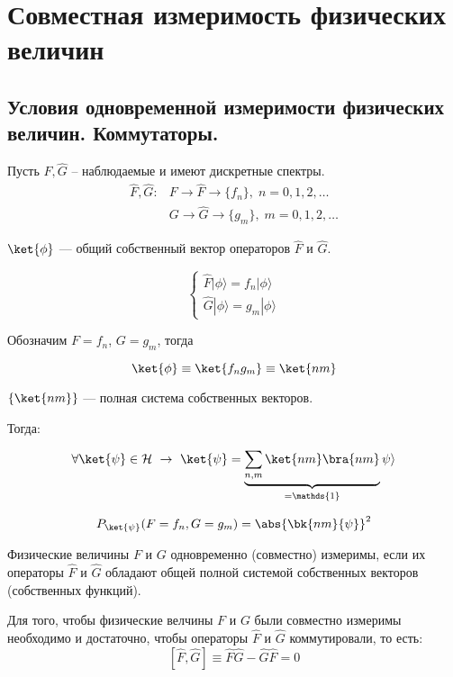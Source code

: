 \chapter{Совместная измеримость физических величин}

\section{Условия одновременной измеримости физических величин. Коммутаторы.}

Пусть $\widehat{F}, \widehat{G}$ -- наблюдаемые и имеют дискретные спектры.
$$
\begin{array}{lcl}
\widehat{F}, \widehat{G}:  & F \rightarrow \widehat{F} \rightarrow \{f_n\}, \; n=0,1,2,\dots\\
                           & G \rightarrow \widehat{G} \rightarrow \{g_m\}, \; m=0,1,2,\dots
\end{array}
$$

$\ket{\phi}$ --- общий собственный вектор операторов $\widehat{F}$ и $\widehat{G}$.

\begin{equation}
\label{eq:4_1_1}
\begin{cases}
\widehat{F} |\phi \rangle = f_n |\phi \rangle\\
\widehat{G} |\phi \rangle = g_m |\phi \rangle
\end{cases} 
\end{equation}

Обозначим $F = f_n$, $G=g_m$, тогда

$$\ket{\phi} \equiv \ket{f_n g_m} \equiv \ket{nm}$$

$\{\ket{nm}\}$ --- полная система собственных векторов.

Тогда:

\begin{equation}
\label{eq:4_1_2}
\forall \ket{\psi} \in \mathcal{H} ~\rightarrow ~ \ket{\psi} = \underbrace{\sum_{n,m}\ket{nm}\bra{nm}}_{=\mathds{1}} \psi \rangle 
\end{equation}

$$P_{\ket{\psi}}(F = f_n, G = g_m) = \abs{\bk{nm}{\psi}}^2$$

\begin{defn}
Физические величины $F$ и $G$ одновременно (совместно) измеримы, если их операторы $\widehat{F}$ и $\widehat{G}$ обладают общей полной системой собственных векторов (собственных функций).
\end{defn}

\begin{thm}\label{theorema_iv_chapter}
Для того, чтобы физические велчины $F$ и $G$ были совместно измеримы необходимо и достаточно, чтобы операторы $\widehat{F}$ и $\widehat{G}$ коммутировали, то есть: 
$$[\widehat{F}, \widehat{G}] \equiv \widehat{F}\widehat{G} - \widehat{G}\widehat{F} = 0$$
\end{thm}

